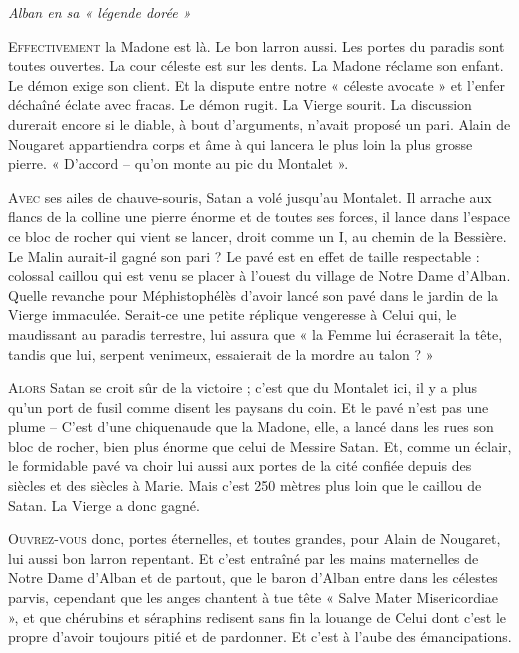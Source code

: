 
\begin{center}
  {\Large\itshape Alban en sa « légende dorée »}
\end{center}
\vspace{1.5em}

\noindent
\lettrine{E}{ffectivement} la Madone est là. Le bon larron aussi. Les portes du paradis sont toutes ouvertes. La cour céleste est sur les dents. La Madone réclame son enfant. Le démon exige son client. Et la dispute entre notre « céleste avocate » et l'enfer déchaîné éclate avec fracas. Le démon rugit. La Vierge sourit. La discussion durerait encore si le diable, à bout d'arguments, n'avait proposé un pari. Alain de Nougaret appartiendra corps et âme à qui lancera le plus loin la plus grosse pierre. « D'accord – qu'on monte au pic du Montalet ».

\medskip

\noindent
\lettrine{A}{vec} ses ailes de chauve-souris, Satan a volé jusqu'au Montalet. Il arrache aux flancs de la colline une pierre énorme et de toutes ses forces, il lance dans l'espace ce bloc de rocher qui vient se lancer, droit comme un I, au chemin de la Bessière. Le Malin aurait-il gagné son pari ? Le pavé est en effet de taille respectable : colossal caillou qui est venu se placer à l'ouest du village de Notre Dame d'Alban. Quelle revanche pour Méphistophélès d'avoir lancé son pavé dans le jardin de la Vierge immaculée. Serait-ce une petite réplique vengeresse à Celui qui, le maudissant au paradis terrestre, lui assura que « la Femme lui écraserait la tête, tandis que lui, serpent venimeux, essaierait de la mordre au talon ? »

\medskip

\noindent
\lettrine{A}{lors} Satan se croit sûr de la victoire ; c'est que du Montalet ici, il y a plus qu'un port de fusil comme disent les paysans du coin. Et le pavé n'est pas une plume – C'est d'une chiquenaude que la Madone, elle, a lancé dans les rues son bloc de rocher, bien plus énorme que celui de Messire Satan. Et, comme un éclair, le formidable pavé va choir lui aussi aux portes de la cité confiée depuis des siècles et des siècles à Marie. Mais c'est 250 mètres plus loin que le caillou de Satan. La Vierge a donc gagné.

\medskip

\noindent
\lettrine{O}{uvrez-vous} donc, portes éternelles, et toutes grandes, pour Alain de Nougaret, lui aussi bon larron repentant. Et c'est entraîné par les mains maternelles de Notre Dame d'Alban et de partout, que le baron d'Alban entre dans les célestes parvis, cependant que les anges chantent à tue tête « Salve Mater Misericordiae », et que chérubins et séraphins redisent sans fin la louange de Celui dont c'est le propre d'avoir toujours pitié et de pardonner. Et c'est à l'aube des émancipations.
